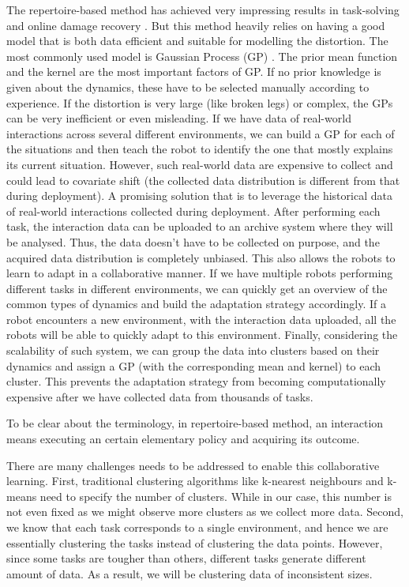 The repertoire-based method has achieved very impressing results in task-solving \cite{EvoRBC} and online damage recovery \cite{RTE}. 
But this method heavily relies on having a good model that is both data efficient and suitable for modelling the distortion. 
The most commonly used model is Gaussian Process (GP) \cite{GP}. The prior mean function and the kernel are the most important factors of GP. 
If no prior knowledge is given about the dynamics, these  have to be selected manually according to experience.
If the distortion is very large (like broken legs) or complex, the GPs can be very inefficient or even misleading.
If we have data of real-world interactions across several different environments, we can build a GP for each of the situations and then teach the robot to identify the one that mostly explains its current situation. However, such real-world data are expensive to collect and could lead to covariate shift (the collected data distribution is different from that during deployment).
A promising solution that is to leverage the historical data of real-world interactions collected during deployment. 
After performing each task, the interaction data can be uploaded to an archive system where they will be analysed. 
Thus, the data doesn't have to be collected on purpose, and the acquired data distribution is completely unbiased. 
This also allows the robots to learn to adapt in a collaborative manner.
If we have multiple robots performing different tasks in different environments, we can quickly get an overview of the  common types of dynamics and build the adaptation strategy accordingly. 
If a robot encounters a new environment, with the interaction data uploaded, all the robots will be able to quickly adapt to this environment.
Finally, considering the scalability of such system, we can group the data into clusters based on their dynamics and assign a GP (with the corresponding mean and kernel) to each cluster. This prevents the adaptation strategy from becoming computationally expensive after we have collected data from thousands of tasks.

To be clear about the terminology, in repertoire-based method, an interaction means executing an certain elementary policy and acquiring its outcome.



There are many challenges needs to be addressed to enable this collaborative learning. First, traditional clustering algorithms like k-nearest neighbours \cite{knn} and k-means \cite{k-means} need to specify the number of clusters. While in our case, this number is not even fixed as we might observe more clusters as we collect more data.
Second, we know that each task corresponds to a single environment, and hence we are essentially clustering the tasks instead of clustering the data points.
However, since some tasks are tougher than others, different tasks generate different amount of data. 
As a result, we will be clustering data of inconsistent sizes.


